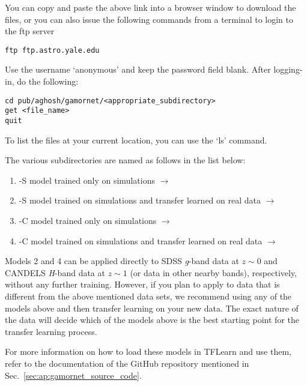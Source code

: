 You can copy and paste the above link into a browser window to download the files, or you can also issue the following commands from a terminal to login to the ftp server

\begin{verbatim}
ftp ftp.astro.yale.edu
\end{verbatim}

Use the username `anonymous' and keep the password field blank. After logging-in, do the following:

\begin{verbatim}
cd pub/aghosh/gamornet/<appropriate_subdirectory> 
get <file_name>
quit
\end{verbatim}

To list the files at your current location, you can use the `ls' command. 

The various subdirectories are named as follows in the list below:

\begin{enumerate}
    \item \gamornet{}-S model trained only on simulations $\xrightarrow{}$ 
    \item \gamornet{}-S model trained on simulations and transfer learned on real data $\xrightarrow{}$ 
    \item \gamornet{}-C model trained only on simulations $\xrightarrow{}$ 
    \item \gamornet{}-C model trained on simulations and transfer learned on real data $\xrightarrow{}$ 
\end{enumerate}

Models 2 and 4 can be applied directly to SDSS \textit{g}-band data at $z\sim0$ and CANDELS \textit{H}-band data at $z\sim1$ (or data in other nearby bands), respectively, without any further training. However, if you plan to apply \gamornet{} to data that is different from the above mentioned data sets, we recommend using any of the models above and then transfer learning on your new data. The exact nature of the data will decide which of the models above is the best starting point for the transfer learning process. 

For more information on how to load these models in TFLearn and use them, refer to the documentation of the \gamornet{} GitHub repository mentioned in Sec.~\ref{sec:ap:gamornet_source_code}.


